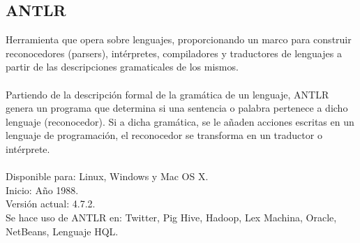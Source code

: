 \documentclass[a4paper,openright,14pt]{report}
\begin{document}
\subsection{ANTLR}
Herramienta que opera sobre lenguajes, proporcionando un marco para construir reconocedores (parsers), int\'erpretes, compiladores y traductores de lenguajes a partir de las descripciones gramaticales de los mismos.\\\\
Partiendo de la descripci\'on formal de la gram\'atica de un lenguaje, ANTLR genera un programa que determina si una sentencia o palabra pertenece a dicho lenguaje (reconocedor). Si a dicha gram\'atica, se le a\~naden acciones escritas en un lenguaje de programaci\'on, el reconocedor se transforma en un traductor o int\'erprete.\\\\
Disponible para:  Linux, Windows y Mac OS X. \\
Inicio: A\~no 1988.\\
Versi\'on actual: 4.7.2.\\
Se hace uso de ANTLR en: Twitter, Pig Hive, Hadoop, Lex Machina, Oracle, NetBeans, Lenguaje HQL.
\end{document}
